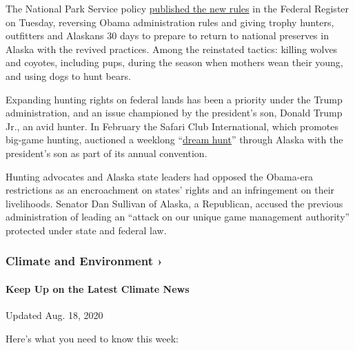 The National Park Service policy
\href{https://www.federalregister.gov/documents/2020/06/09/2020-10877/alaska-hunting-and-trapping-in-national-preserves}{published
the new rules} in the Federal Register on Tuesday, reversing Obama
administration rules and giving trophy hunters, outfitters and Alaskans
30 days to prepare to return to national preserves in Alaska with the
revived practices. Among the reinstated tactics: killing wolves and
coyotes, including pups, during the season when mothers wean their
young, and using dogs to hunt bears.

Expanding hunting rights on federal lands has been a priority under the
Trump administration, and an issue championed by the president's son,
Donald Trump Jr., an avid hunter. In February the Safari Club
International, which promotes big-game hunting, auctioned a weeklong
``\href{https://www.nytimes3xbfgragh.onion/2020/02/04/us/brian-wilson-beach-boys.html?searchResultPosition=3}{dream
hunt}'' through Alaska with the president's son as part of its annual
convention.

Hunting advocates and Alaska state leaders had opposed the Obama-era
restrictions as an encroachment on states' rights and an infringement on
their livelihoods. Senator Dan Sullivan of Alaska, a Republican, accused
the previous administration of leading an ``attack on our unique game
management authority'' protected under state and federal law.

\href{https://www.nytimes3xbfgragh.onion/section/climate?action=click\&pgtype=Article\&state=default\&region=MAIN_CONTENT_1\&context=storylines_keepup}{}

\hypertarget{climate-and-environment-}{%
\subsubsection{Climate and Environment
›}\label{climate-and-environment-}}

\hypertarget{keep-up-on-the-latest-climate-news}{%
\paragraph{Keep Up on the Latest Climate
News}\label{keep-up-on-the-latest-climate-news}}

Updated Aug. 18, 2020

Here's what you need to know this week:

